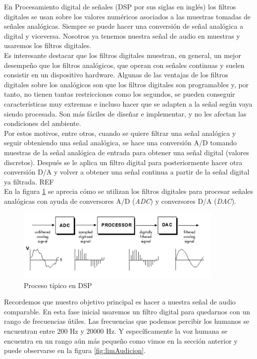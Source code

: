 En Procesamiento digital de señales (DSP por sus siglas en inglés) los filtros digitales se usan sobre los valores numéricos asociados a las muestras tomadas de señales analógicas. Siempre se puede hacer una conversión de señal analógica a digital y viceversa. Nosotros ya tenemos nuestra señal de audio en muestras y usaremos los filtros digitales. \\

Es interesante destacar que los filtros digitales muestran, en general, un mejor desempeño que los filtros analógicos, que operan con señales continuas y suelen consistir en un dispositivo hardware. Algunas de las ventajas de los filtros digitales sobre los analógicos son que los filtros digitales son programables y, por tanto, no tienen tantas restricciones como los segundos, se pueden conseguir características muy extremas e incluso hacer que se adapten a la señal según vaya siendo procesada. Son más fáciles de diseñar e implementar, y no les afectan las condiciones del ambiente.\\

Por estos motivos, entre otros, cuando se quiere filtrar una señal analógica y seguir obteniendo una señal analógica, se hace una conversión A/D tomando muestras de la señal analógica de entrada para obtener una señal digital (valores discretos). Después se le aplica un filtro digital para posteriormente hacer otra conversión D/A y volver a obtener una señal continua a partir de la señal digital ya filtrada. REF \\

En la figura \ref{fig:DSPanalog} se aprecia cómo se utilizan los filtros digitales para procesar señales analógicas con ayuda de conversores A/D (\emph{ADC}) y conversores D/A (\emph{DAC}).

\begin{figure}[th]
\centering
\includegraphics[width=10cm]{Figures/DSP-analog}
\decoRule
\caption[DSPanalog]{Proceso típico en DSP}
\label{fig:DSPanalog}
\end{figure}

Recordemos que nuestro objetivo principal es hacer a nuestra señal de audio comparable. En esta fase inicial usaremos un filtro digital para quedarnos con un rango de frecuencias útiles. Las frecuencias que podemos percibir los humanos se encuentran entre 200 Hz y 20000 Hz. Y específicamente la voz humana se encuentra en un rango aún más pequeño como vimos en la sección anterior y puede observarse en la figura \ref{fig:limAudicion}.  

